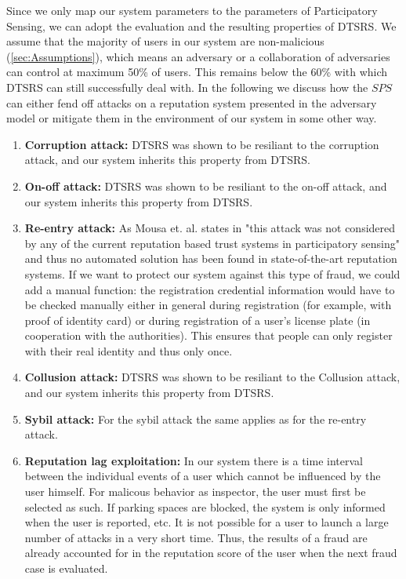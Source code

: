 Since we only map our system parameters to the parameters of Participatory Sensing, we can adopt the evaluation and the resulting properties of DTSRS. We assume that the majority of users in our system are non-malicious (\ref{sec:Assumptions}), which means an adversary or a collaboration of adversaries can control at maximum 50\% of users. This remains below the 60\% with which DTSRS can still successfully deal with. In the following we discuss how the $SPS$ can either fend off attacks on a reputation system presented in the adversary model or mitigate them in the environment of our system in some other way.

\begin{enumerate}
\item \textbf{Corruption attack:} DTSRS was shown to be resiliant to the corruption attack, and our system inherits this property from DTSRS.
\item \textbf{On-off attack:} DTSRS was shown to be resiliant to the on-off attack, and our system inherits this property from DTSRS.
\item \textbf{Re-entry attack:} As Mousa et. al. states in \cite{mousa2015trust} "this attack was not considered by any of the current reputation based trust systems in participatory sensing" and thus no automated solution has been found in state-of-the-art reputation systems. If we want to protect our system against this type of fraud, we could add a manual function: the registration credential information would have to be checked manually either in general during registration  (for example, with proof of identity card) or during registration of a user's license plate (in cooperation with the authorities). This ensures that people can only register with their real identity and thus only once.
\item \textbf{Collusion attack:} DTSRS was shown to be resiliant to the Collusion attack, and our system inherits this property from DTSRS.
\item \textbf{Sybil attack:} For the sybil attack the same applies as for the re-entry attack.
\item \textbf{Reputation lag exploitation:} In our system there is a time interval between the individual events of a user which cannot be influenced by the user himself. For malicous behavior as inspector, the user must first be selected as such. If parking spaces are blocked, the system is only informed when the user is reported, etc. It is not possible for a user to launch a large number of attacks in a very short time. Thus, the results of a fraud are already accounted for in the reputation score of the user when the next fraud case is evaluated.

\end{enumerate}
